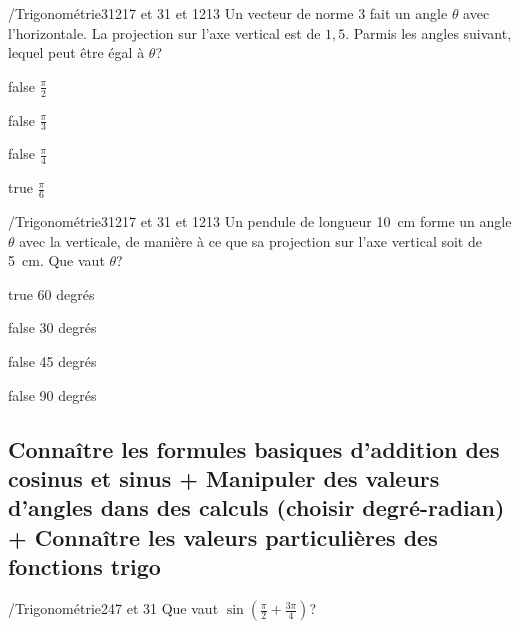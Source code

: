 \documentclass[11pt]{article}
\begin{document}
        	\begin{question}{/}{Trigonométrie}{3}{1217 et 31 et 1213}
				Un vecteur de norme $3$ fait un angle $\theta$ avec l'horizontale. La projection sur l'axe vertical est de $1,5$. Parmis les angles suivant, lequel peut être égal à $\theta$?
            \end{question}

            \begin{reponses}
            	\item[false] $\frac{\pi}{2}$
            	\item[false] $\frac{\pi}{3}$
                \item[false] $\frac{\pi}{4}$
                \item[true] $\frac{\pi}{6}$
            \end{reponses}

            \begin{question}{/}{Trigonométrie}{3}{1217 et 31 et 1213}
                Un pendule de longueur \SI{10}{\centi\meter} forme un angle $\theta$ avec la verticale, de manière à ce que sa projection sur l'axe vertical soit de \SI{5}{\centi\meter}. Que vaut $\theta$?
            \end{question}

            \begin{reponses}
                \item[true] 60 degrés
                \item[false] 30 degrés
                \item[false] 45 degrés
                \item[false] 90 degrés
            \end{reponses}
            
		\subsection{Connaître les formules basiques d’addition des cosinus et sinus + Manipuler des valeurs d'angles dans des calculs (choisir degré-radian) + Connaître les valeurs particulières des fonctions trigo}
    
            \begin{question}{/}{Trigonométrie}{2}{47 et 31}
                Que vaut $\sin(\frac{\pi}{2}+\frac{3\pi}{4})$? 
            \end{question}
\end{document}
